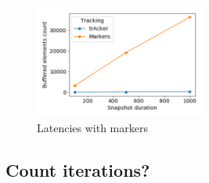 \begin{figure}[htbp]
  \centering
  \includegraphics[width=0.50\textwidth]{pics/buffering_latencies_evolution_watermarks.png}
  \caption{Latencies with markers}
\end{figure}

\subsection{Count iterations?}

